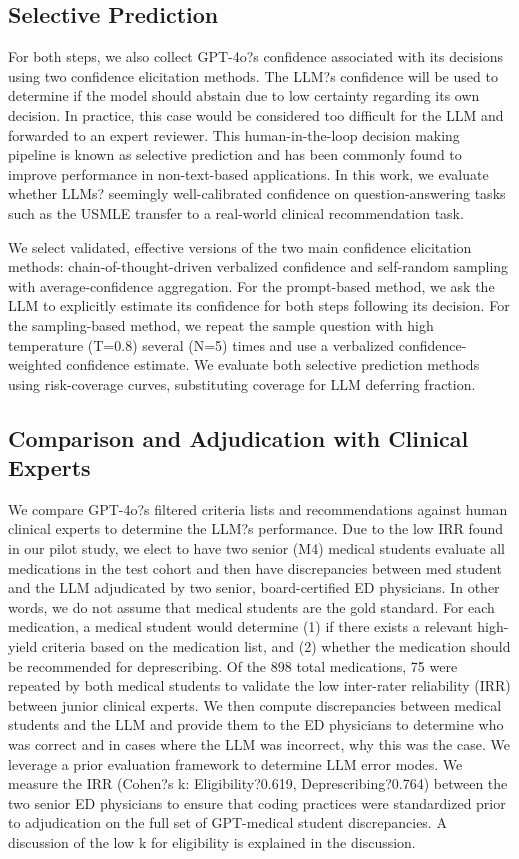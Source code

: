 \subsection{Selective Prediction}

For both steps, we also collect GPT-4o?s confidence associated with its decisions using two confidence elicitation methods. The LLM?s confidence will be used to determine if the model should abstain due to low certainty regarding its own decision. In practice, this case would be considered too difficult for the LLM and forwarded to an expert reviewer. This human-in-the-loop decision making pipeline is known as selective prediction and has been commonly found to improve performance in non-text-based applications. In this work, we evaluate whether LLMs? seemingly well-calibrated confidence on question-answering tasks such as the USMLE transfer to a real-world clinical recommendation task. 

We select validated, effective versions of the two main confidence elicitation methods: chain-of-thought-driven verbalized confidence and self-random sampling with average-confidence aggregation. For the prompt-based method, we ask the LLM to explicitly estimate its confidence for both steps following its decision. For the sampling-based method, we repeat the sample question with high temperature (T=0.8) several (N=5) times and use a verbalized confidence-weighted confidence estimate. We evaluate both selective prediction methods using risk-coverage curves, substituting coverage for LLM deferring fraction. 

\subsection{Comparison and Adjudication with Clinical Experts}

We compare GPT-4o?s filtered criteria lists and recommendations against human clinical experts to determine the LLM?s performance. Due to the low IRR found in our pilot study, we elect to have two senior (M4) medical students evaluate all medications in the test cohort and then have discrepancies between med student and the LLM adjudicated by two senior, board-certified ED physicians. In other words, we do not assume that medical students are the gold standard. For each medication, a medical student would  determine (1) if there exists a relevant high-yield criteria based on the medication list, and (2) whether the medication should be recommended for deprescribing. Of the 898 total medications, 75 were repeated by both medical students to validate the low inter-rater reliability (IRR) between junior clinical experts. We then compute discrepancies between medical students and the LLM and provide them to the ED physicians to determine who was correct and in cases where the LLM was incorrect, why this was the case. We leverage a prior evaluation framework to determine LLM error modes. We measure the IRR (Cohen?s k: Eligibility?0.619, Deprescribing?0.764) between the two senior ED physicians to ensure that coding practices were standardized prior to adjudication on the full set of GPT-medical student discrepancies. A discussion of the low k for eligibility is explained in the discussion. 

